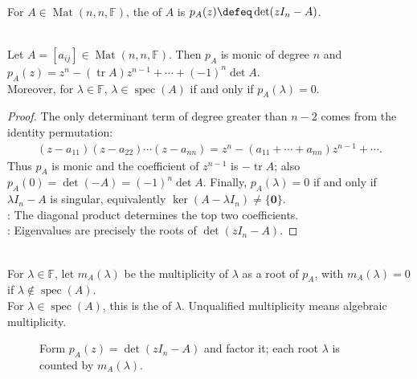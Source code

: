 \begin{definition} \label{def:matrix-characteristic-polynomial} \\
For $A\in\operatorname{Mat}(n,n,\mathbb{F})$, the  of $A$ is $p_A(z)\defeq\det(zI_n-A)$.
\end{definition}

\begin{theorem} \label{thm:matrix-characteristic-polynomial-basic-coefficients} \\
Let $A=[a_{ij}]\in\operatorname{Mat}(n,n,\mathbb{F})$. Then $p_A$ is monic of degree $n$ and $p_A(z)=z^n-(\operatorname{tr}A)z^{n-1}+\cdots+(-1)^n\det A$.\\
Moreover, for $\lambda\in\mathbb{F}$, $\lambda\in\operatorname{spec}(A)$ if and only if $p_A(\lambda)=0$.
\begin{proof}
The only determinant term of degree greater than $n-2$ comes from the identity permutation:
\begin{align}
(z-a_{11})(z-a_{22})\cdots(z-a_{nn})=z^n-(a_{11}+\cdots+a_{nn})z^{n-1}+\cdots.
\nonumber
\end{align}
Thus $p_A$ is monic and the coefficient of $z^{n-1}$ is $-\operatorname{tr}A$; also $p_A(0)=\det(-A)=(-1)^n\det A$. Finally, $p_A(\lambda)=0$ if and only if $\lambda I_n-A$ is singular, equivalently $\ker(A-\lambda I_n)\neq\{\mathbf{0}\}$.\\
: The diagonal product determines the top two coefficients.\\
: Eigenvalues are precisely the roots of $\det(zI_n-A)$.
\end{proof}
\end{theorem}

\begin{definition} \label{def:matrix-algebraic-multiplicity} \\
For $\lambda\in\mathbb{F}$, let $m_A(\lambda)$ be the multiplicity of $\lambda$ as a root of $p_A$, with $m_A(\lambda)=0$ if $\lambda\notin\operatorname{spec}(A)$.\\
For $\lambda\in\operatorname{spec}(A)$, this is the  of $\lambda$. Unqualified multiplicity means algebraic multiplicity.
\end{definition}

\begin{figure}[H]
  \centering
  
  \caption{Form $p_A(z)=\det(zI_n-A)$ and factor it; each root $\lambda$ is counted by $m_A(\lambda)$.}
  \label{fig:characteristic-polynomial-roots}
\end{figure}

